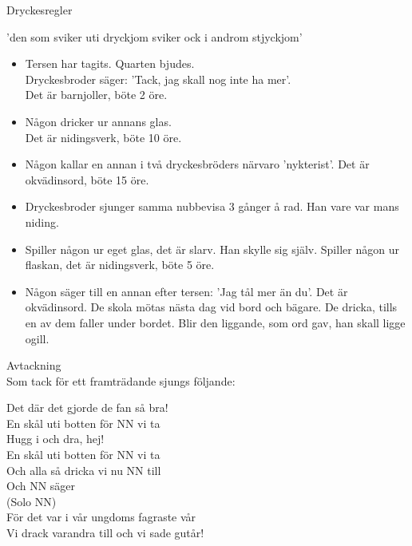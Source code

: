 \begin{flushleft}
{\Huge Dryckesregler\\}
\end{flushleft}
{\large
'den som sviker uti dryckjom sviker ock i androm stjyckjom'
\begin{itemize}
\item Tersen har tagits. Quarten bjudes.\\ Dryckesbroder säger: 'Tack, jag 
skall nog inte ha mer'.\\ Det  är barnjoller, böte 2 öre.
\item Någon dricker ur annans glas. \\Det är nidingsverk, böte 10 öre.
\item Någon kallar en annan i två dryckesbröders närvaro 'nykterist'. 
Det är okvädinsord, böte 15 öre.
\item Dryckesbroder sjunger samma nubbevisa 3 gånger å rad. Han vare var 
mans niding.
\item Spiller någon ur eget glas, det är slarv. Han skylle sig själv. 
Spiller någon ur flaskan, det är nidingsverk, böte 5 öre.
\item Någon säger till en annan efter tersen: 'Jag tål mer än du'. Det 
är okvädinsord. De skola mötas nästa dag vid bord och bägare. De 
dricka, tills en av dem faller under bordet. Blir den liggande, som ord 
gav, han skall ligge ogill.
\end{itemize}

\begin{flushleft}
{\Huge Avtackning\\}
Som tack för ett framträdande sjungs följande:

Det där det gjorde de fan så bra!\\
En skål uti botten för NN vi ta\\
\repopen Hugg i och dra, hej! \repclose\\
En skål uti botten för NN vi ta\\
Och alla så dricka vi nu NN till\\
Och NN säger\\
(Solo NN)\\
För det var i vår ungdoms fagraste vår\\
Vi drack varandra till och vi sade gutår!\\
\end{flushleft}
}


































